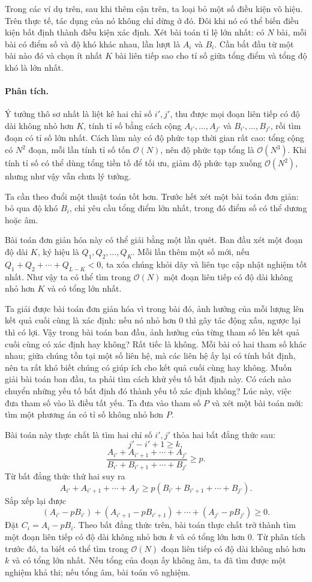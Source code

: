 \documentclass[11pt]{article}
\newcommand{\Oh}{\mathcal{O}}
\begin{document}
Trong các ví dụ trên, sau khi thêm cận trên, ta loại bỏ một số điều kiện vô
hiệu. Trên thực tế, tác dụng của nó không chỉ dừng ở đó. Đôi khi nó có thể
biến điều kiện bất định thành điều kiện xác định. Xét bài toán tỉ lệ lớn nhất:
có $N$ bài, mỗi bài có điểm số và độ khó khác nhau, lần lượt là $A_i$ và
$B_i$. Cần bắt đầu từ một bài nào đó và chọn ít nhất $K$ bài liên tiếp sao cho
tỉ số giữa tổng điểm và tổng độ khó là lớn nhất.

\paragraph{Phân tích.}
Ý tưởng thô sơ nhất là liệt kê hai chỉ số $i',j'$, thu được mọi đoạn liên tiếp
có độ dài không nhỏ hơn $K$, tính tỉ số bằng cách cộng
$A_{i'},\ldots,A_{j'}$ và $B_{i'},\ldots,B_{j'}$, rồi tìm đoạn có tỉ số lớn
nhất. Cách làm này có độ phức tạp thời gian rất cao: tổng cộng có $N^2$ đoạn,
mỗi lần tính tỉ số tốn $\Oh(N)$, nên độ phức tạp tổng là $\Oh(N^3)$. Khi tính
tỉ số có thể dùng tổng tiền tố để tối ưu, giảm độ phức tạp xuống $\Oh(N^2)$,
nhưng như vậy vẫn chưa lý tưởng.

Ta cần theo đuổi một thuật toán tốt hơn. Trước hết xét một bài toán đơn giản:
bỏ qua độ khó $B_i$, chỉ yêu cầu tổng điểm lớn nhất, trong đó điểm số có thể
dương hoặc âm.

Bài toán đơn giản hóa này có thể giải bằng một lần quét. Ban đầu xét một đoạn
độ dài $K$, ký hiệu là $Q_1,Q_2,\ldots,Q_K$. Mỗi lần thêm một số mới, nếu
$Q_1+Q_2+\cdots+Q_{L-K}<0$, ta xóa chúng khỏi dãy và liên tục cập nhật nghiệm
tốt nhất. Như vậy ta có thể tìm trong $\Oh(N)$ một đoạn liên tiếp có độ dài
không nhỏ hơn $K$ và có tổng lớn nhất.

Ta giải được bài toán đơn giản hóa vì trong bài đó, ảnh hưởng của mỗi lượng
lên kết quả cuối cùng là xác định: nếu nó nhỏ hơn $0$ thì gây tác động xấu,
ngược lại thì có lợi. Vậy trong bài toán ban đầu, ảnh hưởng của từng tham số
lên kết quả cuối cùng có xác định hay không? Rất tiếc là không. Mỗi bài có hai
tham số khác nhau; giữa chúng tồn tại một số liên hệ, mà các liên hệ ấy lại có
tính bất định, nên ta rất khó biết chúng có giúp ích cho kết quả cuối cùng hay
không. Muốn giải bài toán ban đầu, ta phải tìm cách khử yếu tố bất định này.
Có cách nào chuyển những yếu tố bất định đó thành yếu tố xác định không? Lúc
này, việc đưa tham số vào là điều tất yếu. Ta đưa vào tham số $P$ và xét một
bài toán mới: tìm một phương án có tỉ số không nhỏ hơn $P$.

Bài toán này thực chất là tìm hai chỉ số $i',j'$ thỏa hai bất đẳng thức sau:
\[
  j'-i'+1\ge k,
\]
\[
  \frac{A_{i'}+A_{i'+1}+\cdots+A_{j'}}
       {B_{i'}+B_{i'+1}+\cdots+B_{j'}}\ge p.
\]
Từ bất đẳng thức thứ hai suy ra
\[
  A_{i'}+A_{i'+1}+\cdots+A_{j'}
  \ge p(B_{i'}+B_{i'+1}+\cdots+B_{j'}).
\]
Sắp xếp lại được
\[
  (A_{i'}-pB_{i'})+(A_{i'+1}-pB_{i'+1})+\cdots+
  (A_{j'}-pB_{j'})\ge 0.
\]
Đặt $C_i=A_i-pB_i$. Theo bất đẳng thức trên, bài toán thực chất trở thành tìm
một đoạn liên tiếp có độ dài không nhỏ hơn $k$ và có tổng lớn hơn $0$. Từ phân
tích trước đó, ta biết có thể tìm trong $\Oh(N)$ đoạn liên tiếp có độ dài
không nhỏ hơn $k$ và có tổng lớn nhất. Nếu tổng của đoạn ấy không âm, ta đã
tìm được một nghiệm khả thi; nếu tổng âm, bài toán vô nghiệm.
\end{document}
